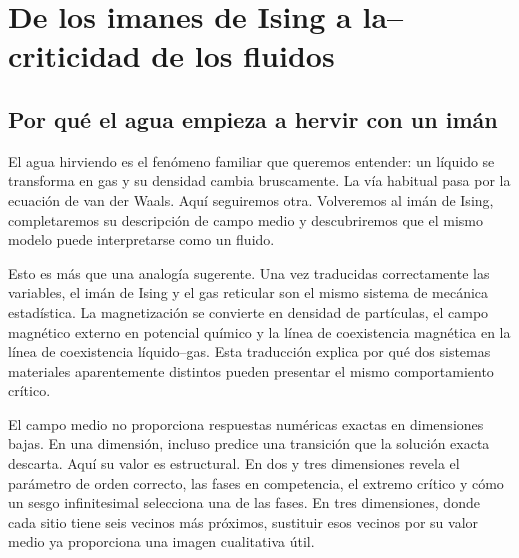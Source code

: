 \chapter{De los imanes de Ising a la--criticidad de los fluidos}


\section{Por qué el agua empieza a hervir con un imán}

El agua hirviendo es el fenómeno familiar que queremos entender: un líquido se transforma en gas y su densidad cambia bruscamente. La vía habitual pasa por la ecuación de van der Waals. Aquí seguiremos otra. Volveremos al imán de Ising, completaremos su descripción de campo medio y descubriremos que el mismo modelo puede interpretarse como un fluido.

Esto es más que una analogía sugerente. Una vez traducidas correctamente las variables, el imán de Ising y el gas reticular son el mismo sistema de mecánica estadística. La magnetización se convierte en densidad de partículas, el campo magnético externo en potencial químico y la línea de coexistencia magnética en la línea de coexistencia líquido--gas. Esta traducción explica por qué dos sistemas materiales aparentemente distintos pueden presentar el mismo comportamiento crítico.

El campo medio no proporciona respuestas numéricas exactas en dimensiones bajas. En una dimensión, incluso predice una transición que la solución exacta descarta. Aquí su valor es estructural. En dos y tres dimensiones revela el parámetro de orden correcto, las fases en competencia, el extremo crítico y cómo un sesgo infinitesimal selecciona una de las fases. En tres dimensiones, donde cada sitio tiene seis vecinos más próximos, sustituir esos vecinos por su valor medio ya proporciona una imagen cualitativa útil.

